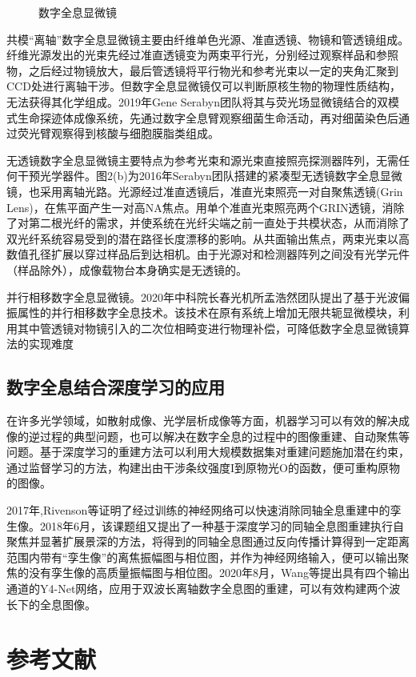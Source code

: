 \documentclass{article}
\begin{document}
\begin{figure}[!h]
	\caption{\heiti{}数字全息显微镜}
	
\end{figure}
共模“离轴”数字全息显微镜主要由纤维单色光源、准直透镜、物镜和管透镜组成。纤维光源发出的光束先经过准直透镜变为两束平行光，分别经过观察样品和参照物，之后经过物镜放大，最后管透镜将平行物光和参考光束以一定的夹角汇聚到CCD处进行离轴干涉。但数字全息显微镜仅可以判断原核生物的物理性质结构，无法获得其化学组成。2019年Gene Serabyn团队将其与荧光场显微镜结合的双模式生命探迹体成像系统，先通过数字全息臂观察细菌生命活动，再对细菌染色后通过荧光臂观察得到核酸与细胞膜脂类组成。


无透镜数字全息显微镜主要特点为参考光束和源光束直接照亮探测器阵列，无需任何干预光学器件。图2(b)为2016年Serabyn团队搭建的紧凑型无透镜数字全息显微镜，也采用离轴光路。光源经过准直透镜后，准直光束照亮一对自聚焦透镜(Grin Lens)，在焦平面产生一对高NA焦点。用单个准直光束照亮两个GRIN透镜，消除了对第二根光纤的需求，并使系统在光纤尖端之前一直处于共模状态，从而消除了双光纤系统容易受到的潜在路径长度漂移的影响。从共面输出焦点，两束光束以高数值孔径扩展以穿过样品后到达相机。由于光源对和检测器阵列之间没有光学元件（样品除外），成像载物台本身确实是无透镜的。


并行相移数字全息显微镜。2020年中科院长春光机所孟浩然团队提出了基于光波偏振属性的并行相移数字全息技术。该技术在原有系统上增加无限共轭显微模块，利用其中管透镜对物镜引入的二次位相畸变进行物理补偿，可降低数字全息显微镜算法的实现难度
	\subsection{数字全息结合深度学习的应用}
		\songti{}\indent
	在许多光学领域，如散射成像、光学层析成像等方面，机器学习可以有效的解决成像的逆过程的典型问题，也可以解决在数字全息的过程中的图像重建、自动聚焦等问题。基于深度学习的重建方法可以利用大规模数据集对重建问题施加潜在约束，通过监督学习的方法，构建出由干涉条纹强度I到原物光O的函数，便可重构原物的图像。


2017年,Rivenson等证明了经过训练的神经网络可以快速消除同轴全息重建中的孪生像。2018年6月，该课题组又提出了一种基于深度学习的同轴全息图重建执行自聚焦并显著扩展景深的方法，将得到的同轴全息图通过反向传播计算得到一定距离范围内带有“孪生像”的离焦振幅图与相位图，并作为神经网络输入，便可以输出聚焦的没有孪生像的高质量振幅图与相位图。2020年8月，Wang等提出具有四个输出通道的Y4-Net网络，应用于双波长离轴数字全息图的重建，可以有效构建两个波长下的全息图像。

	
	\section{参考文献}
	\songti{}
	
\end{document}
